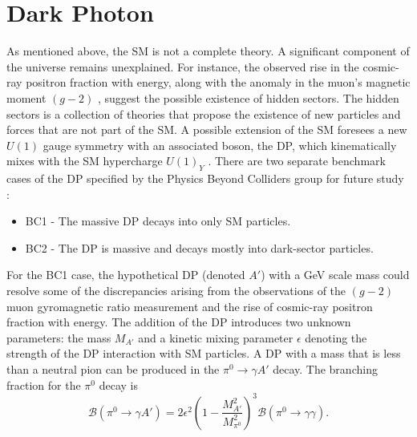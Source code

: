\documentclass[../main.tex]{subfiles}
\begin{document}
    \section{Dark Photon} \label{sec:DarkP_th}
    As mentioned above, the \gls{SM} is not a complete theory. A significant component of the universe remains unexplained. For instance, the observed rise in the cosmic-ray positron fraction with energy, along with the anomaly in the muon's magnetic moment $(g-2)$ \cite{Muong-2:2023cdq}, suggest the possible existence of hidden sectors. 
    The hidden sectors is a collection of theories that propose the existence of new particles and forces that are not part of the \gls{SM}.
    A possible extension of the \gls{SM} foresees a new $U(1)$ gauge symmetry with an associated boson, the \gls{DP}, which kinematically mixes with the SM hypercharge $U(1)_Y$ \cite{Fabbrichesi:2020wbt}. There are two separate benchmark cases of the \gls{DP} specified by the Physics Beyond Colliders group for future study \cite{Beacham_2020}: 
    \begin{itemize}
        \item BC1 - The massive DP decays into only SM particles.
        \item BC2 - The DP is massive and decays mostly into dark-sector particles.
    \end{itemize}
    For the BC1 case, the hypothetical \gls{DP} (denoted $A'$) with a \si{\giga\electronvolt} scale mass could resolve some of the discrepancies arising from the observations of the $(g-2)$ muon gyromagnetic ratio measurement and the rise of cosmic-ray positron fraction with energy. The addition of the \gls{DP} introduces two unknown parameters: the mass $M_{A'}$ and a kinetic mixing parameter $\epsilon$ denoting the strength of the \gls{DP} interaction with SM particles. A \gls{DP} with a mass that is less than a neutral pion
    can be produced in the $\pi^0 \to \gamma A'$ decay. The branching fraction for the $\pi^0$ decay is \cite{PhysRevD.80.095024}
    \begin{equation}\label{eq:DP_branch}
        \mathcal{B}(\pi^0 \to \gamma A') = 2\epsilon^2 \left(1-\frac{M_{A'}^2}{M_{\pi^0}^2}\right)^3 \mathcal{B}(\pi^0 \to \gamma \gamma).
    \end{equation}
    
\end{document}
